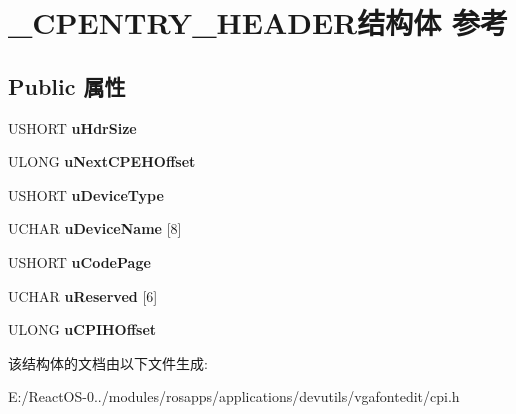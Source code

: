 \hypertarget{struct___c_p_e_n_t_r_y___h_e_a_d_e_r}{}\section{\+\_\+\+C\+P\+E\+N\+T\+R\+Y\+\_\+\+H\+E\+A\+D\+E\+R结构体 参考}
\label{struct___c_p_e_n_t_r_y___h_e_a_d_e_r}
\subsection*{Public 属性}
\begin{DoxyCompactItemize}
\item 
\mbox{\label{struct___c_p_e_n_t_r_y___h_e_a_d_e_r_ab5a2b517deff97562cc604f87449c327}} 
U\+S\+H\+O\+RT {\bfseries u\+Hdr\+Size}
\item 
\mbox{\label{struct___c_p_e_n_t_r_y___h_e_a_d_e_r_a67fdf8ce00f4727b22feed2db1cf4446}} 
U\+L\+O\+NG {\bfseries u\+Next\+C\+P\+E\+H\+Offset}
\item 
\mbox{\label{struct___c_p_e_n_t_r_y___h_e_a_d_e_r_a5a3c1af3cc67b23479bdbc6fb7f6dbc2}} 
U\+S\+H\+O\+RT {\bfseries u\+Device\+Type}
\item 
\mbox{\label{struct___c_p_e_n_t_r_y___h_e_a_d_e_r_a0776024a27ea87eb121244a1d5c5a9a4}} 
U\+C\+H\+AR {\bfseries u\+Device\+Name} \mbox{[}8\mbox{]}
\item 
\mbox{\label{struct___c_p_e_n_t_r_y___h_e_a_d_e_r_ae968474950679b47bc336bddf4fe76d2}} 
U\+S\+H\+O\+RT {\bfseries u\+Code\+Page}
\item 
\mbox{\label{struct___c_p_e_n_t_r_y___h_e_a_d_e_r_a15557fe01f015fe5bc8e901839bc9456}} 
U\+C\+H\+AR {\bfseries u\+Reserved} \mbox{[}6\mbox{]}
\item 
\mbox{\label{struct___c_p_e_n_t_r_y___h_e_a_d_e_r_a89ef9c46ba10695c818418b0759759a4}} 
U\+L\+O\+NG {\bfseries u\+C\+P\+I\+H\+Offset}
\end{DoxyCompactItemize}


该结构体的文档由以下文件生成\+:\begin{DoxyCompactItemize}
\item 
E\+:/\+React\+O\+S-\/0../modules/rosapps/applications/devutils/vgafontedit/cpi.\+h\end{DoxyCompactItemize}
